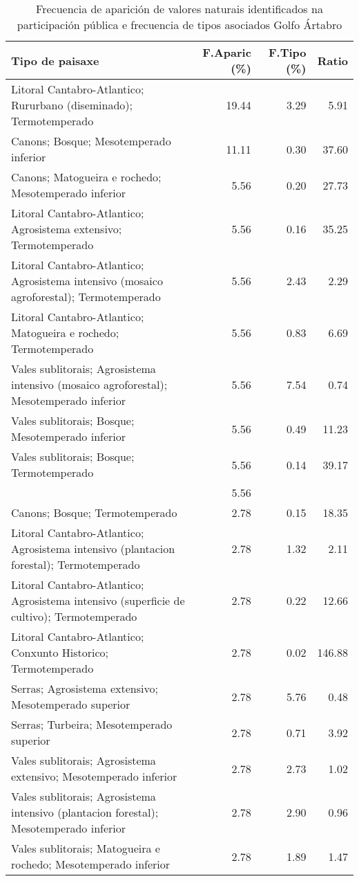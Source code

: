 \begin{table}[p]
\centering
\caption{Frecuencia de aparición de valores naturais identificados na participación pública e frecuencia de tipos asociados Golfo Ártabro} 
\label{vsixotnat1}
\begin{tabular}{lrrr}
  \hline
Tipo de paisaxe & F.Aparic (\%) & F.Tipo (\%) & Ratio \\ 
  \hline
Litoral Cantabro-Atlantico; Rururbano (diseminado); Termotemperado & 19.44 & 3.29 & 5.91 \\ 
  Canons; Bosque; Mesotemperado inferior & 11.11 & 0.30 & 37.60 \\ 
  Canons; Matogueira e rochedo; Mesotemperado inferior & 5.56 & 0.20 & 27.73 \\ 
  Litoral Cantabro-Atlantico; Agrosistema extensivo; Termotemperado & 5.56 & 0.16 & 35.25 \\ 
  Litoral Cantabro-Atlantico; Agrosistema intensivo (mosaico agroforestal); Termotemperado & 5.56 & 2.43 & 2.29 \\ 
  Litoral Cantabro-Atlantico; Matogueira e rochedo; Termotemperado & 5.56 & 0.83 & 6.69 \\ 
  Vales sublitorais; Agrosistema intensivo (mosaico agroforestal); Mesotemperado inferior & 5.56 & 7.54 & 0.74 \\ 
  Vales sublitorais; Bosque; Mesotemperado inferior & 5.56 & 0.49 & 11.23 \\ 
  Vales sublitorais; Bosque; Termotemperado & 5.56 & 0.14 & 39.17 \\ 
   & 5.56 &  &  \\ 
  Canons; Bosque; Termotemperado & 2.78 & 0.15 & 18.35 \\ 
  Litoral Cantabro-Atlantico; Agrosistema intensivo (plantacion forestal); Termotemperado & 2.78 & 1.32 & 2.11 \\ 
  Litoral Cantabro-Atlantico; Agrosistema intensivo (superficie de cultivo); Termotemperado & 2.78 & 0.22 & 12.66 \\ 
  Litoral Cantabro-Atlantico; Conxunto Historico; Termotemperado & 2.78 & 0.02 & 146.88 \\ 
  Serras; Agrosistema extensivo; Mesotemperado superior & 2.78 & 5.76 & 0.48 \\ 
  Serras; Turbeira; Mesotemperado superior & 2.78 & 0.71 & 3.92 \\ 
  Vales sublitorais; Agrosistema extensivo; Mesotemperado inferior & 2.78 & 2.73 & 1.02 \\ 
  Vales sublitorais; Agrosistema intensivo (plantacion forestal); Mesotemperado inferior & 2.78 & 2.90 & 0.96 \\ 
  Vales sublitorais; Matogueira e rochedo; Mesotemperado inferior & 2.78 & 1.89 & 1.47 \\ 
   \hline
\end{tabular}
\end{table}
